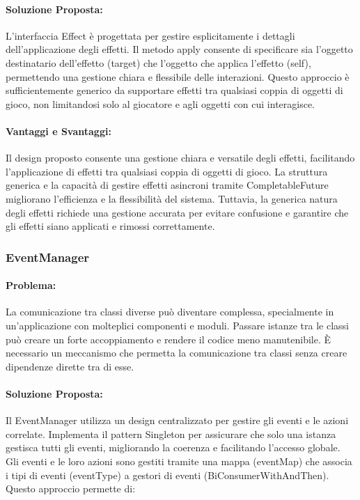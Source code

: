 \documentclass[a4paper,12pt]{report}
\begin{document}
\paragraph{Soluzione Proposta:} L’interfaccia Effect è progettata per gestire esplicitamente i dettagli dell’applicazione degli effetti. Il metodo apply consente di specificare sia l’oggetto destinatario dell’effetto (target) che l’oggetto che applica l’effetto (self), permettendo una gestione chiara e flessibile delle interazioni. Questo approccio è sufficientemente generico da supportare effetti tra qualsiasi coppia di oggetti di gioco, non limitandosi solo al giocatore e agli oggetti con cui interagisce.

\paragraph{Vantaggi e Svantaggi:}
Il design proposto consente una gestione chiara e versatile degli effetti, facilitando l’applicazione di effetti tra qualsiasi coppia di oggetti di gioco. La struttura generica e la capacità di gestire effetti asincroni tramite CompletableFuture migliorano l’efficienza e la flessibilità del sistema. Tuttavia, la generica natura degli effetti richiede una gestione accurata per evitare confusione e garantire che gli effetti siano applicati e rimossi correttamente.

\subsubsection{EventManager}

\paragraph{Problema:} La comunicazione tra classi diverse può diventare complessa, specialmente in un’applicazione con molteplici componenti e moduli. Passare istanze tra le classi può creare un forte accoppiamento e rendere il codice meno manutenibile. È necessario un meccanismo che permetta la comunicazione tra classi senza creare dipendenze dirette tra di esse.

\paragraph{Soluzione Proposta:} Il EventManager utilizza un design centralizzato per gestire gli eventi e le azioni correlate. Implementa il pattern Singleton per assicurare che solo una istanza gestisca tutti gli eventi, migliorando la coerenza e facilitando l’accesso globale. Gli eventi e le loro azioni sono gestiti tramite una mappa (eventMap) che associa i tipi di eventi (eventType) a gestori di eventi (BiConsumerWithAndThen). Questo approccio permette di:
\end{document}
